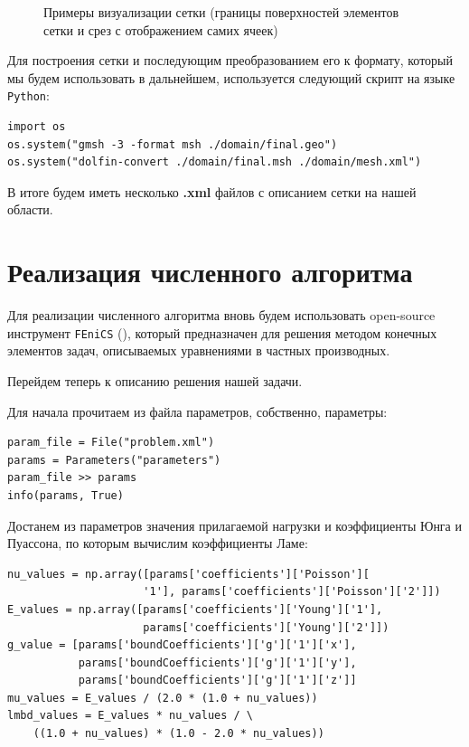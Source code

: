 \documentclass[a4paper, 14pt]{extreport}
\begin{document}
\begin{figure}[H]
\begin{subfigure}[h]{0.5\textwidth}
	\end{subfigure}
	\caption{Примеры визуализации сетки (границы поверхностей элементов сетки и срез с отображением самих ячеек)}
	\label{fig: mesh_display}
\end{figure}

Для построения сетки и последующим преобразованием его к формату, который 
мы будем использовать в дальнейшем, используется следующий скрипт на языке \texttt{Python}:

\begin{lstlisting}
import os
os.system("gmsh -3 -format msh ./domain/final.geo")
os.system("dolfin-convert ./domain/final.msh ./domain/mesh.xml")
\end{lstlisting}

В итоге будем иметь несколько \textbf{.xml} файлов с описанием
сетки на нашей области.

\section{Реализация численного алгоритма}

Для реализации численного алгоритма вновь будем использовать open-source
инструмент \texttt{FEniCS} (\cite{fenics_book}), который предназначен для решения методом
конечных элементов задач, описываемых уравнениями в частных производных. 

Перейдем теперь к описанию решения нашей задачи.

Для начала прочитаем из файла параметров, собственно, параметры:
\begin{lstlisting}
param_file = File("problem.xml")
params = Parameters("parameters")
param_file >> params
info(params, True)
\end{lstlisting}

Достанем из параметров значения прилагаемой нагрузки и
коэффициенты Юнга и Пуассона, по которым вычислим коэффициенты Ламе:
\begin{lstlisting}
nu_values = np.array([params['coefficients']['Poisson'][
                     '1'], params['coefficients']['Poisson']['2']])
E_values = np.array([params['coefficients']['Young']['1'],
                     params['coefficients']['Young']['2']])
g_value = [params['boundCoefficients']['g']['1']['x'],
           params['boundCoefficients']['g']['1']['y'],
           params['boundCoefficients']['g']['1']['z']]
mu_values = E_values / (2.0 * (1.0 + nu_values))
lmbd_values = E_values * nu_values / \
    ((1.0 + nu_values) * (1.0 - 2.0 * nu_values))
\end{lstlisting}
\end{document}
